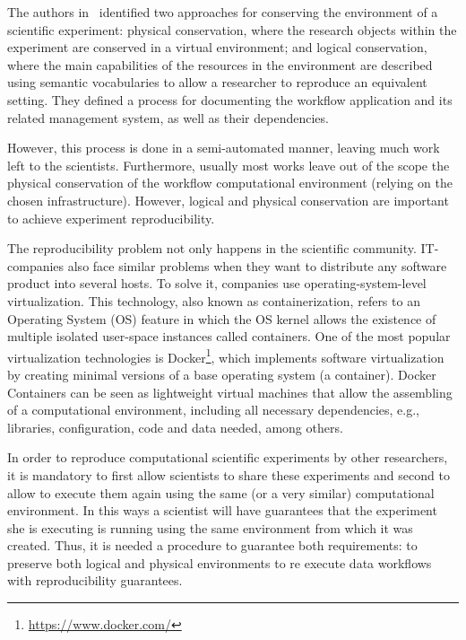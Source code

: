 The authors in~\cite{santana2017reproducibility} identified two approaches for conserving the environment of a scientific experiment: physical conservation, where the research objects within the experiment are conserved in a virtual environment; and logical conservation, where the main capabilities of the resources in the environment are described using semantic vocabularies to allow a researcher to reproduce an equivalent setting. They defined a process for documenting the workflow application and its related management system, as well as their dependencies. 

However, this process is done in a semi-automated manner, leaving much work left to the scientists. Furthermore, usually most works leave out of the scope the physical conservation of the workflow computational environment (relying on the chosen infrastructure). However, logical and physical conservation are important to achieve experiment reproducibility. 

The reproducibility problem not only happens in the scientific community. IT-companies also face similar problems when they want to distribute any software product into several hosts. To solve it, companies use operating-system-level virtualization. This technology, also known as containerization, refers to an Operating System (OS) feature in which the OS kernel allows the existence of multiple isolated user-space instances called containers. 
One of the most popular virtualization technologies is Docker\footnote{\url{https://www.docker.com/}}, which implements software virtualization by creating minimal versions of a base operating system (a container). 
Docker Containers can be seen as lightweight virtual machines that allow the assembling of a computational environment, including all necessary dependencies, e.g., libraries, configuration, code and data needed, among others. 

In order to reproduce computational scientific experiments by other researchers, it is mandatory to first allow scientists to share these experiments and second to allow to execute them again using the same (or a very similar) computational environment. In this ways a scientist will have guarantees that the experiment she is executing is running using the same environment from which it was created. Thus, it is needed a procedure to guarantee both requirements: to preserve both logical and physical environments to re execute data workflows with reproducibility guarantees.

